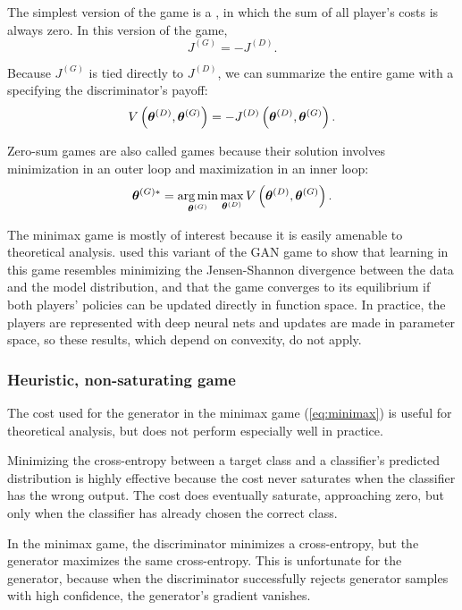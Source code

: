 The simplest version of the game is a , in which the sum of all player's
costs is always zero.
In this version of the game,
\begin{equation}
J^{(G)} = - J^{(D)}.
\label{eq:minimax}
\end{equation}

Because $J^{(G)}$ is tied directly to $J^{(D)}$, we can summarize the entire game with a
 specifying the discriminator's payoff:
\[ V\left({\bm{\theta}}^{(D)}, {\bm{\theta}}^{(G)} \right) = - J^{(D)} \left({\bm{\theta}}^{(D)}, {\bm{\theta}}^{(G)} \right).\]

Zero-sum games are also called  games because their solution involves minimization
in an outer loop and maximization in an inner loop:
\[ {\bm{\theta}}^{(G)*} = \operatorname*{arg\,min}_{{\bm{\theta}}^{(G)}} \max_{{\bm{\theta}}^{(D)}} V\left({\bm{\theta}}^{(D)}, {\bm{\theta}}^{(G)} \right) . \]

The minimax game is mostly of interest because it is easily amenable to theoretical analysis.
\citet{Goodfellow-et-al-NIPS2014-small} used this variant of the GAN game to show that learning in
this game resembles minimizing the Jensen-Shannon divergence between the data and the model distribution,
and that the game converges to its equilibrium if both players' policies can be updated directly in
function space.
In practice, the players are represented with deep neural nets and updates are made in parameter space,
so these results, which depend on convexity, do not apply.

\subsubsection{Heuristic, non-saturating game}

The cost used for the generator in the minimax game (\eqref{eq:minimax}) is useful for theoretical analysis,
but does not perform especially well in practice.

Minimizing the cross-entropy between a target class and a classifier's predicted distribution
is highly effective because the cost never saturates when the classifier has the wrong output.
The cost does eventually saturate, approaching zero, but only when the classifier has already
chosen the correct class.

In the minimax game, the discriminator minimizes a cross-entropy, but the generator maximizes
the same cross-entropy.
This is unfortunate for the generator, because when the discriminator successfully rejects
generator samples with high confidence, the generator's gradient vanishes.


